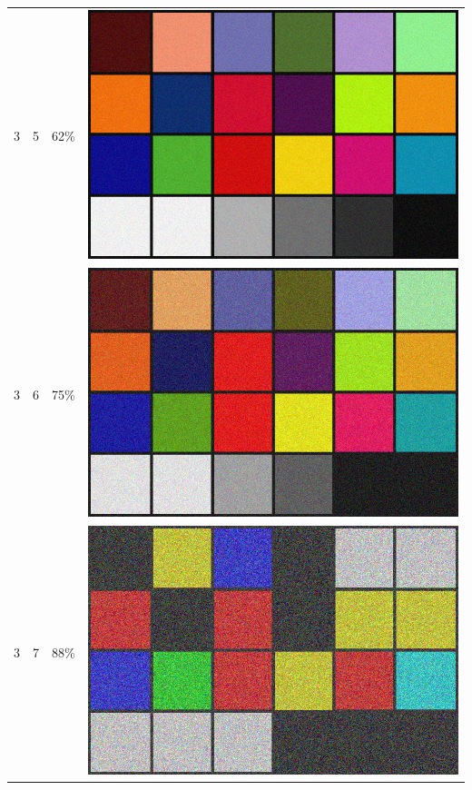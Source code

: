 \documentclass[times, utf8, seminar, numeric]{fer}
\begin{document}
\begin{center}
\begin{longtable}{|c|c|c|c|}
3 & 5 &62\% & \includegraphics[scale=0.3]{../benchmark_results/color_chart/3_components-5_bits.png} \\
3 & 6 &75\% & \includegraphics[scale=0.3]{../benchmark_results/color_chart/3_components-6_bits.png} \\
3 & 7 &88\% & \includegraphics[scale=0.3]{../benchmark_results/color_chart/3_components-7_bits.png} \\

\end{longtable}
\end{center}
\end{document}
